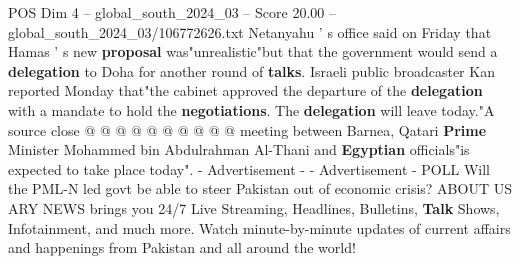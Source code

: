 \begin{textsample}{POS Dim 4 – global\_south\_2024\_03 – Score 20.00 – global\_south\_2024\_03/106772626.txt}
Netanyahu ' s office said on Friday that Hamas ' s new \textbf{proposal} was"unrealistic"but that the government would send a \textbf{delegation} to Doha for another round of \textbf{talks}.
Israeli public broadcaster Kan reported Monday that"the cabinet approved the departure of the \textbf{delegation} with a mandate to hold the \textbf{negotiations}.
The \textbf{delegation} will leave today."A source close @ @ @ @ @ @ @ @ @ @ meeting between Barnea, Qatari \textbf{Prime} Minister Mohammed bin Abdulrahman Al-Thani and \textbf{Egyptian} officials"is expected to take place today". - Advertisement - - Advertisement - POLL Will the PML-N led govt be able to steer Pakistan out of economic crisis?
ABOUT US ARY NEWS brings you 24/7 Live Streaming, Headlines, Bulletins, \textbf{Talk} Shows, Infotainment, and much more.
Watch minute-by-minute updates of current affairs and happenings from Pakistan and all around the world!

\end{textsample}
